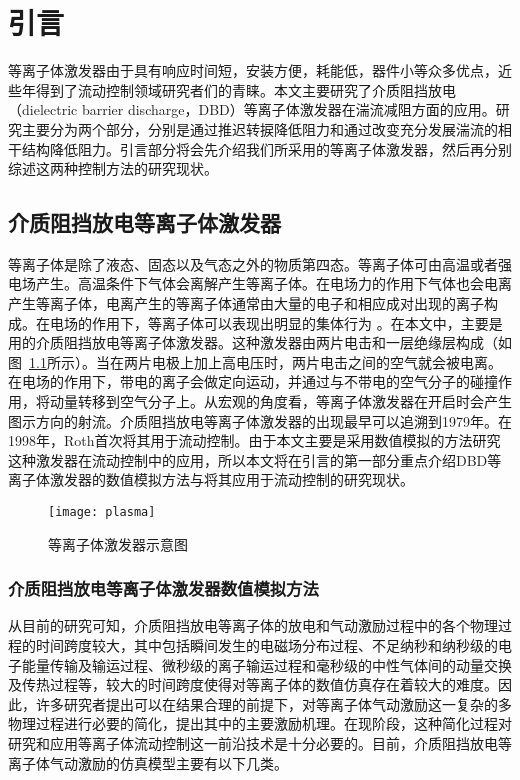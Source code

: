 \chapter{引言}
\label{cha:intro}

等离子体激发器由于具有响应时间短，安装方便，耗能低，器件小等众多优点，近些年得到了流动控制领域研究者们的青睐。本文主要研究了介质阻挡放电（dielectric barrier discharge，DBD）等离子体激发器在湍流减阻方面的应用。研究主要分为两个部分，分别是通过推迟转捩降低阻力和通过改变充分发展湍流的相干结构降低阻力。引言部分将会先介绍我们所采用的等离子体激发器，然后再分别综述这两种控制方法的研究现状。


\section{介质阻挡放电等离子体激发器}

等离子体是除了液态、固态以及气态之外的物质第四态\cite{zhangguling2008,niewanshang2012}。等离子体可由高温或者强电场产生。高温条件下气体会离解产生等离子体。在电场力的作用下气体也会电离产生等离子体，电离产生的等离子体通常由大量的电子和相应成对出现的离子构成。在电场的作用下，等离子体可以表现出明显的集体行为
\cite{wuhong2015}。在本文中，主要是用的介质阻挡放电等离子体激发器。这种激发器由两片电击和一层绝缘层构成（如图~\ref{fig:SchematicPlasma}所示）。当在两片电极上加上高电压时，两片电击之间的空气就会被电离。在电场的作用下，带电的离子会做定向运动，并通过与不带电的空气分子的碰撞作用，将动量转移到空气分子上。从宏观的角度看，等离子体激发器在开启时会产生图示方向的射流。介质阻挡放电等离子体激发器的出现最早可以追溯到1979年\cite{Masuda1979}。在1998年，Roth首次将其用于流动控制\cite{Roth1998}。由于本文主要是采用数值模拟的方法研究这种激发器在流动控制中的应用，所以本文将在引言的第一部分重点介绍DBD等离子体激发器的数值模拟方法与将其应用于流动控制的研究现状。
\begin{figure}
  \centering
  \texttt{[image: plasma]}
  \caption{等离子体激发器示意图\cite{Whalley2012}}\label{fig:SchematicPlasma}
\end{figure}

\subsection{介质阻挡放电等离子体激发器数值模拟方法}
从目前的研究可知，介质阻挡放电等离子体的放电和气动激励过程中的各个物理过程的时间跨度较大，其中包括瞬间发生的电磁场分布过程、不足纳秒和纳秒级的电子能量传输及输运过程、微秒级的离子输运过程和毫秒级的中性气体间的动量交换及传热过程等，较大的时间跨度使得对等离子体的数值仿真存在着较大的难度。因此，许多研究者提出可以在结果合理的前提下，对等离子体气动激励这一复杂的多物理过程进行必要的简化，提出其中的主要激励机理。在现阶段，这种简化过程对研究和应用等离子体流动控制这一前沿技术是十分必要的。目前，介质阻挡放电等离子体气动激励的仿真模型主要有以下几类。

